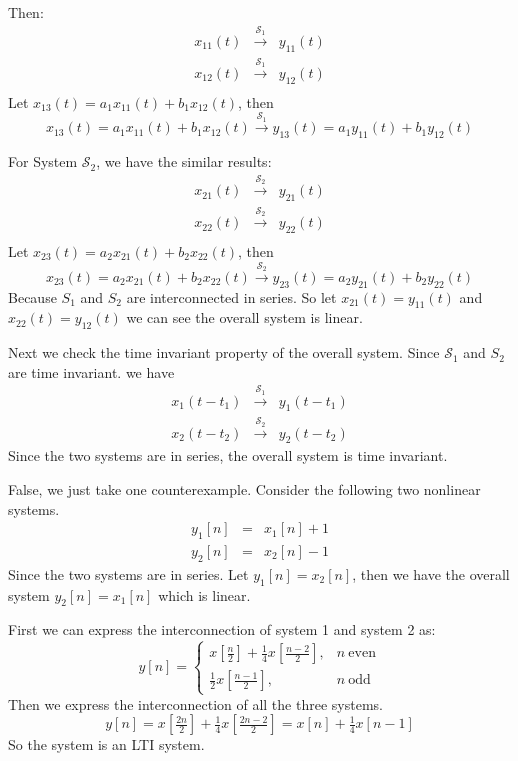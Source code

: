\documentclass[koma,a4paper,utopia,12pt,listings-color,microtype,paralist,colorlinks,urlcolor=red]{org-article}
\begin{document}
Then:
\begin{eqnarray*}
x_{11}(t)&\xrightarrow{\mathcal{S}_{1}} & y_{11}(t)  \\
x_{12}(t)&\xrightarrow{\mathcal{S}_{1}} & y_{12}(t)  \\
\end{eqnarray*}
Let \(x_{13}(t) = a_{1} x_{11}(t) + b_{1}x_{12}(t)\), then
\begin{equation*}
x_{13}(t)  = a_{1} x_{11}(t) + b_{1}x_{12}(t) \xrightarrow{\mathcal{S}_{1}}  y_{13}(t) = a_{1}y_{11}(t) + b_{1} y_{12}(t)
\end{equation*}

For System \(\mathcal{S}_{2}\), we have the similar results:
\begin{eqnarray*}
x_{21}(t)&\xrightarrow{\mathcal{S}_{2}} & y_{21}(t)  \\
x_{22}(t)&\xrightarrow{\mathcal{S}_{2}} & y_{22}(t)  \\
\end{eqnarray*}
Let \(x_{23}(t) = a_{2} x_{21}(t) + b_{2}x_{22}(t)\), then
\begin{equation*}
x_{23}(t)  = a_{2} x_{21}(t) + b_{2}x_{22}(t) \xrightarrow{\mathcal{S}_{2}}  y_{23}(t) = a_{2}y_{21}(t) + b_{2} y_{22}(t)
\end{equation*}
Because \(S_{1}\) and \(S_{2}\) are interconnected in series. So let \(x_{21}(t) = y_{11}(t)\) and \(x_{22}(t) = y_{12}(t)\) we can see the overall
system is linear.

Next we check the time invariant property of the overall system. Since
\(\mathcal{S}_{1}\) and \(S_{2}\) are time invariant. we have
\begin{eqnarray*}
x_{1}(t-t_{1})&\xrightarrow{\mathcal{S}_{1}}& y_{1}(t-t_{1}) \\
x_{2}(t-t_{2})&\xrightarrow{\mathcal{S}_{2}}& y_{2}(t-t_{2})
\end{eqnarray*}
Since the two systems are in series, the overall system is time invariant.

False, we just take one counterexample. Consider the following two nonlinear systems.
\begin{eqnarray*}
y_{1}[n] &=& x_{1}[n] + 1 \\
y_{2}[n] &=& x_{2}[n] - 1
\end{eqnarray*}
Since the two systems are in series. Let \(y_{1}[n] = x_{2}[n]\), then we have
the overall system \(y_{2}[n] = x_{1}[n]\) which is linear.

First we can express the interconnection of system 1 and system 2 as:
\begin{equation*}
y[n] =
\begin{cases}
x[ \frac{n}{2} ] + \frac{1}{4} x[ \frac{n-2}{2} ] , & n \ \mathrm{even} \\
\frac{1}{2} x[ \frac{n-1}{2} ] , & n \ \mathrm{odd}
\end{cases}
\end{equation*}
Then we express the interconnection of all the three systems.
\begin{equation*}
y[n] = x[ \tfrac{2n}{2} ] + \tfrac{1}{4} x[ \tfrac{2n-2}{2} ] = x[n] + \tfrac{1}{4} x[n-1]
\end{equation*}
So the system is an LTI system.
\end{document}
